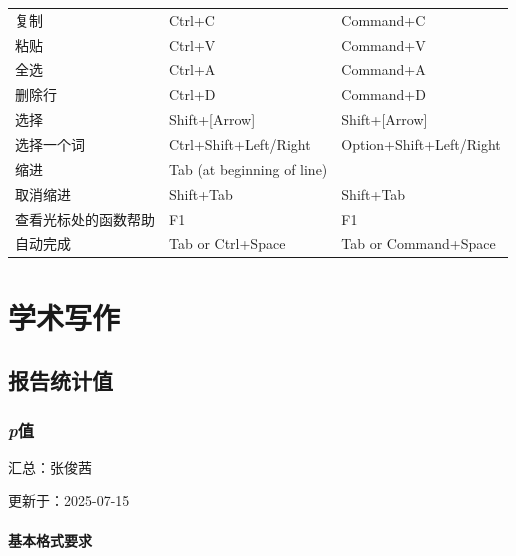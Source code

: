 \documentclass[]{ctexbook}
\theoremstyle{definition}
\theoremstyle{definition}
\theoremstyle{definition}
\theoremstyle{definition}
\theoremstyle{remark}
\begin{document}
\begin{longtable}[]{@{}lll@{}}
复制 & Ctrl+C & Command+C \\
粘贴 & Ctrl+V & Command+V \\
全选 & Ctrl+A & Command+A \\
删除行 & Ctrl+D & Command+D \\
选择 & Shift+{[}Arrow{]} & Shift+{[}Arrow{]} \\
选择一个词 & Ctrl+Shift+Left/Right & Option+Shift+Left/Right \\
缩进 & Tab (at beginning of line) & \\
取消缩进 & Shift+Tab & Shift+Tab \\
查看光标处的函数帮助 & F1 & F1 \\
自动完成 & Tab or Ctrl+Space & Tab or Command+Space \\
\end{longtable}

\part{学术写作}\label{part-ux5b66ux672fux5199ux4f5c}

\chapter{报告统计值}\label{ux62a5ux544aux7edfux8ba1ux503c}

\section{\texorpdfstring{\emph{p}值}{p值}}\label{pvalue}

汇总：张俊茜

更新于：2025-07-15

\subsection{基本格式要求}\label{ux57faux672cux683cux5f0fux8981ux6c42}
\end{document}
